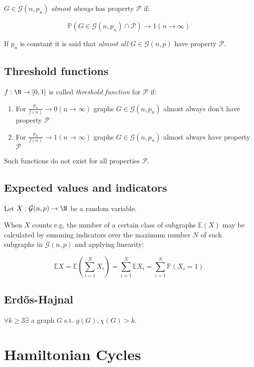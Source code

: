 $G \in \mathcal{G}(n,p_n)$ \emph{almost always} has property $\mathcal{P}$ if:

$$\mathbb{P}(G \in \mathcal{G}(n,p_n) \cap \mathcal{P}) \to 1 (n \to \infty)$$

If $p_n$ is constant it is said that \emph{almost all} $G \in \mathcal{G}(n,p)$ have property $\mathcal{P}$.

\subsection*{Threshold functions}

$f : \N \to [0,1]$ is called \emph{threshold function} for $\mathcal{P}$ if:

\begin{enumerate}
	\item For $\frac{p_n}{f(n)} \to 0 (n \to \infty)$ graphs $G \in \mathcal{G}(n,p_n)$ almost always don't have property $\mathcal{P}$
	\item For $\frac{p_n}{f(n)} \to 1 (n \to \infty)$ graphs $G \in \mathcal{G}(n,p_n)$ almost always have property $\mathcal{P}$
\end{enumerate}

Such functions do not exist for all properties $\mathcal{P}$.

\subsection*{Expected values and indicators}

Let $X : \mathcal{G}(n,p) \to \N$ be a random variable.

When $X$ counts e.g. the number of a certain class of subgraphs $\mathbb{E}(X)$ may be calculated by summing indicators over the maximum number $N$ of such subgraphs in $\mathcal{G}(n,p)$ and applying linearity:

\vspace*{-4mm}
$$\mathbb{E}X = \mathbb{E}\left(\sum_{i=1}^N X_i\right) = \sum_{i=1}^N \mathbb{E}X_i = \sum_{i=1}^N \mathbb{P}(X_i=1)$$

\subsection*{Erd\H{o}s-Hajnal}

$\forall k \geq 3 \exists$ a graph $G$ s.t. $g(G), \chi(G) > k$.

\section*{Hamiltonian Cycles}


